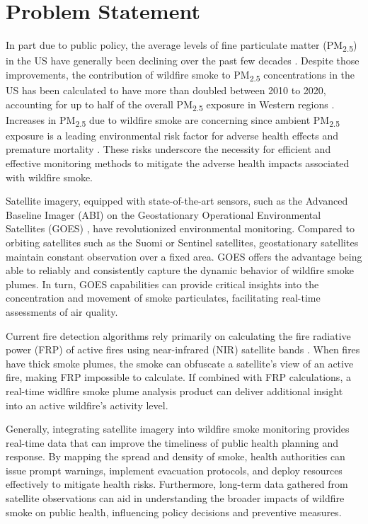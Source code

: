 \section{Problem Statement}
\label{sec:intro}

In part due to public policy, the average levels of fine particulate matter (PM\textsubscript{2.5}) in the US have generally been declining over the past few decades \cite{clean_air_act}. Despite those improvements, the contribution of wildfire smoke to PM\textsubscript{2.5} concentrations in the US has been calculated to have more than doubled between 2010 to 2020, accounting for up to half of the overall PM\textsubscript{2.5} exposure in Western regions \cite{smoke_PM}. Increases in PM\textsubscript{2.5} due to wildfire smoke are concerning since ambient PM\textsubscript{2.5} exposure is a leading environmental risk factor for adverse health effects and premature mortality \cite{smoke_mortality}.  These risks underscore the necessity for efficient and effective monitoring methods to mitigate the adverse health impacts associated with wildfire smoke. 

Satellite imagery, equipped with state-of-the-art sensors, such as the Advanced Baseline Imager (ABI) on the Geostationary Operational Environmental Satellites (GOES) \cite{goes}, have revolutionized environmental monitoring. Compared to orbiting satellites such as the Suomi or Sentinel satellites, geostationary satellites maintain constant observation over a fixed area. GOES offers the advantage being able to reliably and consistently capture the dynamic behavior of wildfire smoke plumes. In turn, GOES capabilities can provide critical insights into the concentration and movement of smoke particulates, facilitating real-time assessments of air quality.

Current fire detection algorithms rely primarily on calculating the fire radiative power (FRP) of active fires using near-infrared (NIR) satellite bands \cite{frp}. When fires have thick smoke plumes, the smoke can obfuscate a satellite's view of an active fire, making FRP impossible to calculate. If combined with FRP calculations, a real-time widlfire smoke plume analysis product can deliver additional insight into an active wildfire's activity level. 

Generally, integrating satellite imagery into wildfire smoke monitoring provides real-time data that can improve the timeliness of public health planning and response. By mapping the spread and density of smoke, health authorities can issue prompt warnings, implement evacuation protocols, and deploy resources effectively to mitigate health risks. Furthermore, long-term data gathered from satellite observations can aid in understanding the broader impacts of wildfire smoke on public health, influencing policy decisions and preventive measures. 

